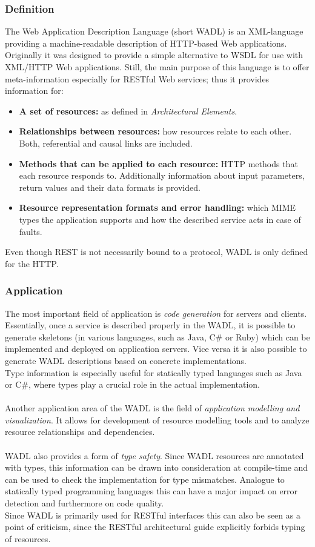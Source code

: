 \subsubsection{Definition}
The Web Application Description Language (short WADL) is an XML-language providing a machine-readable description of HTTP-based  Web applications. Originally it was designed to provide a simple alternative to WSDL for use with XML/HTTP Web applications. Still, the main purpose of this language is to offer meta-information especially for RESTful Web services; thus it provides information for: 
\begin{itemize}
\item{{\bf A set of resources:} as defined in \emph{Architectural Elements}.}
\item{{\bf Relationships between resources:} how resources relate to each other. Both, referential and causal links are included.}
\item{{\bf Methods that can be applied to each resource:} HTTP methods that each resource responds to. Additionally information about input parameters, return values and their data formats is provided.}
\item{{\bf Resource representation formats and error handling:} which MIME types the application supports and how the described service acts in case of faults. \cite{WADL}}
\end{itemize}
Even though REST is not necessarily bound to a protocol, WADL is only defined for the HTTP.
\subsubsection{Application}
The most important field of application is \emph{code generation} for servers and clients. Essentially, once a service is described properly in the WADL, it is possible to generate skeletons (in various languages, such as Java, C\# or Ruby) which can be implemented and deployed on application servers. Vice versa it is also possible to generate WADL descriptions based on concrete implementations.
\\
Type information is especially useful for statically typed languages such as Java or C\#, where types play a crucial role in the actual implementation.
\\ \\
Another application area of the WADL is the field of \emph{application modelling and visualization}. It allows for development of resource modelling tools and to analyze resource relationships and dependencies. \cite{WADL}
\\ \\
WADL also provides a form of \emph{type safety}. Since WADL resources are annotated with types, this information can be drawn into consideration at compile-time and can be used to check the implementation for type mismatches. Analogue to statically typed programming languages this can have a major impact on error detection and furthermore on code quality.
\\
Since WADL is primarily used for RESTful interfaces this can also be seen as a point of criticism, since the RESTful architectural guide explicitly forbids typing of resources.

